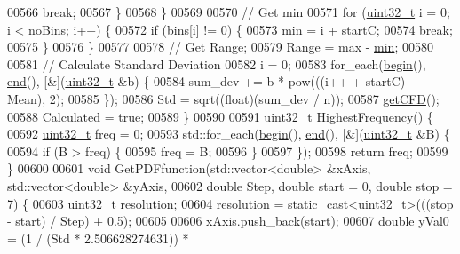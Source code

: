 \begin{DoxyCode}
00566         \textcolor{keywordflow}{break};
00567       \}
00568     \}
00569 
00570     \textcolor{comment}{// Get min}
00571     \textcolor{keywordflow}{for} (\hyperlink{_soil_math_types_8h_a435d1572bf3f880d55459d9805097f62}{uint32\_t} i = 0; i < \hyperlink{class_soil_math_1_1_stats_a4202c9085eacaff2e04eda84fc90e92b}{noBins}; i++) \{
00572       \textcolor{keywordflow}{if} (bins[i] != 0) \{
00573         min = i + startC;
00574         \textcolor{keywordflow}{break};
00575       \}
00576     \}
00577 
00578     \textcolor{comment}{// Get Range;}
00579     Range = max - \hyperlink{class_soil_math_1_1_stats_aa44c07a23b1c2ce0f0407e7cee4f39a9}{min};
00580 
00581     \textcolor{comment}{// Calculate Standard Deviation}
00582     i = 0;
00583     for\_each(\hyperlink{class_soil_math_1_1_stats_ab4b0109ffb55f1d39acfad46bfd3bad5}{begin}(), \hyperlink{class_soil_math_1_1_stats_a9d60ce82a2786e0422c3683c301f34ae}{end}(), [&](\hyperlink{_soil_math_types_8h_a435d1572bf3f880d55459d9805097f62}{uint32\_t} &b) \{
00584       sum\_dev += b * pow(((i++ + startC) - Mean), 2);
00585     \});
00586     Std = sqrt((\textcolor{keywordtype}{float})(sum\_dev / n));
00587     \hyperlink{class_soil_math_1_1_stats_a5508190fbea17bfec505ff8c47b1a45e}{getCFD}();
00588     Calculated = \textcolor{keyword}{true};
00589   \}
00590 
00591   \hyperlink{_soil_math_types_8h_a435d1572bf3f880d55459d9805097f62}{uint32\_t} HighestFrequency() \{
00592     \hyperlink{_soil_math_types_8h_a435d1572bf3f880d55459d9805097f62}{uint32\_t} freq = 0;
00593     std::for\_each(\hyperlink{class_soil_math_1_1_stats_ab4b0109ffb55f1d39acfad46bfd3bad5}{begin}(), \hyperlink{class_soil_math_1_1_stats_a9d60ce82a2786e0422c3683c301f34ae}{end}(), [&](\hyperlink{_soil_math_types_8h_a435d1572bf3f880d55459d9805097f62}{uint32\_t} &B) \{
00594       \textcolor{keywordflow}{if} (B > freq) \{
00595         freq = B;
00596       \}
00597     \});
00598     \textcolor{keywordflow}{return} freq;
00599   \}
00600 
00601   \textcolor{keywordtype}{void} GetPDFfunction(std::vector<double> &xAxis, std::vector<double> &yAxis,
00602                       \textcolor{keywordtype}{double} Step, \textcolor{keywordtype}{double} start = 0, \textcolor{keywordtype}{double} stop = 7) \{
00603     \hyperlink{_soil_math_types_8h_a435d1572bf3f880d55459d9805097f62}{uint32\_t} resolution;
00604     resolution = \textcolor{keyword}{static\_cast<}\hyperlink{_soil_math_types_8h_a435d1572bf3f880d55459d9805097f62}{uint32\_t}\textcolor{keyword}{>}(((stop - start) / Step) + 0.5);
00605 
00606     xAxis.push\_back(start);
00607     \textcolor{keywordtype}{double} yVal0 = (1 / (Std * 2.506628274631)) *

\end{DoxyCode}
